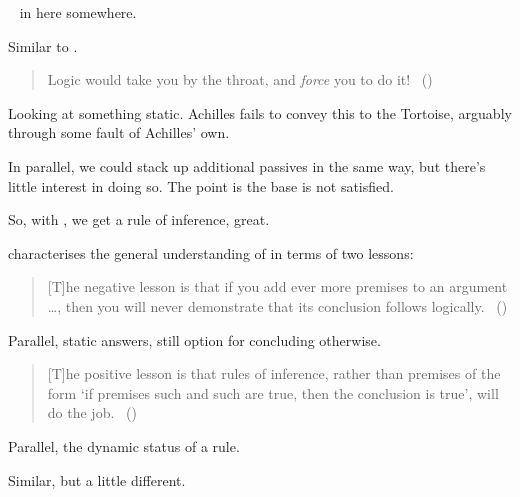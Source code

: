 \begin{note}
  \color{red}

  ~\cite{Besson:2018wz} in here somewhere.
\end{note}

\begin{note}
  Similar to \citeauthor{Carroll:1895uj}.
  \begin{quote}
    Logic would take you by the throat, and \emph{force} you to do it!%
    \mbox{ }\hfill\mbox{(\citeyear[280]{Carroll:1895uj})}
  \end{quote}
  Looking at something static.
  Achilles fails to convey this to the Tortoise, arguably through some fault of Achilles' own.

  In parallel, we could stack up additional passives in the same way, but there's little interest in doing so.
  The point is the base \requ{} is not satisfied.
\end{note}

\begin{note}
  So, with \citeauthor{Carroll:1895uj}, we get a rule of inference, great.

  \citeauthor{Wieland:2013vf} characterises the general understanding of \textcite{Carroll:1895uj} in terms of two lessons:
  \begin{quote}
    [T]he negative lesson is that if you add ever more premises to an argument \dots, then you will never demonstrate that its conclusion follows logically.%
    \mbox{ }\hfill\mbox{(\citeyear[984]{Wieland:2013vf})}
  \end{quote}

  Parallel, static answers, still option for concluding otherwise.

  \begin{quote}
    [T]he positive lesson is that rules of inference, rather than premises of the form `if premises such and such are true, then the conclusion is true', will do the job.%
    \mbox{ }\hfill\mbox{(\citeyear[984]{Wieland:2013vf})}
  \end{quote}

  Parallel, the dynamic status of a rule.
\end{note}

\begin{note}
  Similar, but a little different.
\end{note}

